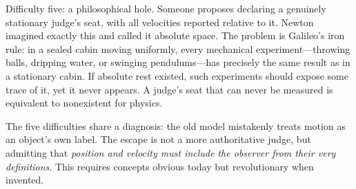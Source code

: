 Difficulty five: a philosophical hole. Someone proposes declaring a genuinely stationary judge's seat, with all velocities reported relative to it. Newton imagined exactly this and called it absolute space. The problem is Galileo's iron rule: in a sealed cabin moving uniformly, every mechanical experiment---throwing balls, dripping water, or swinging pendulums---has precisely the same result as in a stationary cabin. If absolute rest existed, such experiments should expose some trace of it, yet it never appears. A judge's seat that can never be measured is equivalent to nonexistent for physics.

The five difficulties share a diagnosis: the old model mistakenly treats motion as an object's own label. The escape is not a more authoritative judge, but admitting that \emph{position and velocity must include the observer from their very definitions}. This requires concepts obvious today but revolutionary when invented.

